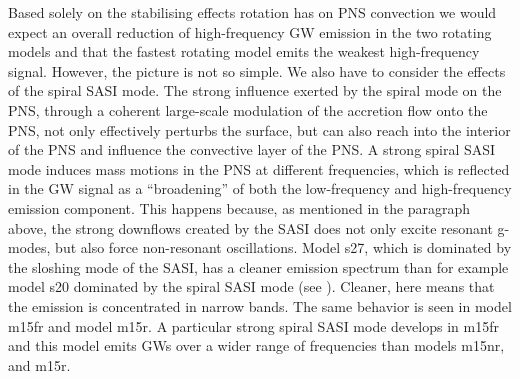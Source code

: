 Based solely on the stabilising effects rotation has on PNS convection we would expect an overall reduction of high-frequency GW emission in the two rotating models and that the fastest rotating model
emits the weakest high-frequency signal. However, the picture is not
so simple. 
We also have to consider the effects of the spiral SASI mode.
The strong influence exerted by the spiral mode on the PNS, through a coherent large-scale
modulation of the accretion flow onto the PNS, not only effectively perturbs the surface, 
but can also reach into the interior of the PNS and influence the convective layer of the PNS.
A strong spiral SASI mode induces mass motions in the PNS at different frequencies, which is 
reflected in the GW signal as a ``broadening'' of both the low-frequency and high-frequency
emission component. This happens because, as mentioned in the paragraph above, the strong downflows created by the SASI does not only excite resonant g-modes, but also force non-resonant oscillations. 
Model s27, which is dominated by the sloshing mode of the SASI,
has a cleaner emission spectrum than for example model s20 dominated by the spiral SASI mode (see ). 
Cleaner, here means that the emission is concentrated in narrow bands. The same behavior is seen in model m15fr and
model m15r. A particular strong spiral SASI mode develops in m15fr and this model emits GWs over a
wider range of frequencies than models m15nr, and m15r. 
